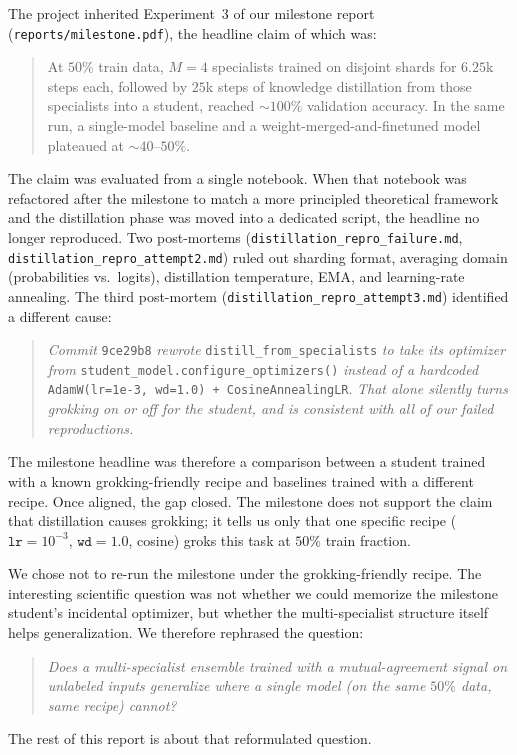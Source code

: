 \documentclass[11pt,a4paper]{article}
\begin{document}
The project inherited Experiment~3 of our milestone report
(\texttt{reports/milestone.pdf}), the headline claim of which was:
\begin{quote}
At $50\%$ train data, $M{=}4$ specialists trained on disjoint shards
for $6{.}25$k steps each, followed by $25$k steps of knowledge
distillation from those specialists into a student, reached
$\sim$$100\%$ validation accuracy. In the same run, a single-model
baseline and a weight-merged-and-finetuned model plateaued at
$\sim$$40$--$50\%$.
\end{quote}
The claim was evaluated from a single notebook. When that notebook was
refactored after the milestone to match a more principled theoretical
framework and the distillation phase was moved into a dedicated
script, the headline no longer reproduced. Two post-mortems
(\texttt{distillation\_repro\_failure.md},
\texttt{distillation\_repro\_attempt2.md}) ruled out sharding format,
averaging domain (probabilities vs.\ logits), distillation temperature,
EMA, and learning-rate annealing. The third post-mortem
(\texttt{distillation\_repro\_attempt3.md}) identified a different
cause:
\begin{quote}
\textit{Commit} \texttt{9ce29b8} \textit{rewrote}
\texttt{distill\_from\_specialists} \textit{to take its optimizer from}
\texttt{student\_model.configure\_optimizers()} \textit{instead of a
hardcoded} \texttt{AdamW(lr=1e-3, wd=1.0) + CosineAnnealingLR}.
\textit{That alone silently turns grokking on or off for the student,
and is consistent with all of our failed reproductions.}
\end{quote}
The milestone headline was therefore a comparison between a student
trained with a known grokking-friendly recipe and baselines trained
with a different recipe. Once aligned, the gap closed. The milestone
does not support the claim that distillation causes grokking; it
tells us only that one specific recipe
($\mathtt{lr}{=}10^{-3}$, $\mathtt{wd}{=}1.0$, cosine) groks this task
at $50\%$ train fraction.

We chose not to re-run the milestone under the grokking-friendly
recipe. The interesting scientific question was not whether we could
memorize the milestone student's incidental optimizer, but whether
the multi-specialist structure itself helps generalization. We
therefore rephrased the question:
\begin{quote}
\emph{Does a multi-specialist ensemble trained with a mutual-agreement
signal on unlabeled inputs generalize where a single model (on the
same $50\%$ data, same recipe) cannot?}
\end{quote}
The rest of this report is about that reformulated question.
\end{document}
